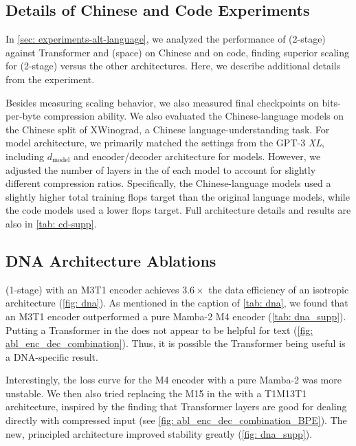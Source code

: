 \subsection{Details of Chinese and Code Experiments}

In \cref{sec: experiments-alt-language}, we analyzed the performance of \model{} (2-stage) against Transformer and \model{} (space) on Chinese and on code, finding superior scaling for \model{} (2-stage) versus the other architectures.
Here, we describe additional details from the experiment.


Besides measuring scaling behavior, we also measured final checkpoints on bits-per-byte compression ability.
We also evaluated the Chinese-language models on the Chinese split of XWinograd, a Chinese language-understanding task.
For model architecture, we primarily matched the settings from the GPT-3 \textit{XL}, including $d_{\text{model}}$ and encoder/decoder architecture for \model{} models.
However, we adjusted the number of layers in the \main{} of each model to account for slightly different compression ratios.
Specifically, the Chinese-language models used a slightly higher total training flops target than the original language models, while the code models used a lower flops target.
Full architecture details and results are also in \cref{tab: cd-supp}.

\subsection{DNA Architecture Ablations}

\label{sec: dna_supp}
\model{} (1-stage) with an \colorbox{EncDec0}{M3T1} encoder achieves $3.6\times$ the data efficiency of an isotropic architecture (\cref{fig: dna}).
As mentioned in the caption of \cref{tab: dna}, we found that an \colorbox{EncDec0}{M3T1} encoder outperformed a pure Mamba-2 \colorbox{EncDec0}{M4} encoder (\cref{tab: dna_supp}).
Putting a Transformer in the \encoder{} does not appear to be helpful for text (\cref{fig: abl_enc_dec_combination}). 
Thus, it is possible the Transformer being useful is a DNA-specific result.

Interestingly, the loss curve for the \colorbox{EncDec0}{M4} encoder with a pure Mamba-2 \main{} was more unstable.
We then also tried replacing the \colorbox{Main}{M15} in the \main{} with a \colorbox{Main}{T1M13T1} architecture,
inspired by the finding that Transformer layers are good for dealing directly with compressed input (see \cref{fig: abl_enc_dec_combination_BPE}).
The new, principled \main{} architecture improved stability greatly (\cref{fig: dna_supp}).

